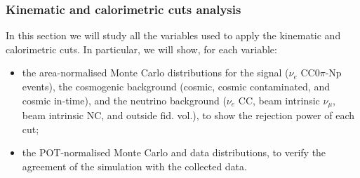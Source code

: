 \subsubsection{Kinematic and calorimetric cuts analysis}

In this section we will study all the variables used to apply the kinematic and calorimetric cuts. In particular, we will show, for each variable:
\begin{itemize}
\item the area-normalised Monte Carlo distributions for the signal ($\nu_{e}$ CC0$\pi$-Np events), the cosmogenic background (cosmic, cosmic contaminated, and cosmic in-time), and the neutrino background ($\nu_{e}$ CC, beam intrinsic $\nu_{\mu}$, beam intrinsic NC, and outside fid. vol.), to show the rejection power of each cut;
\item the POT-normalised Monte Carlo and data distributions, to verify the agreement of the simulation with the collected data.
\end{itemize}

